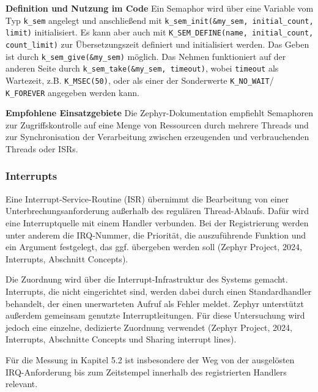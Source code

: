 \textbf{Definition und Nutzung im Code }Ein Semaphor wird {\"u}ber eine Variable vom Typ \lstinline[style=fileinline]|k_sem| angelegt und anschlie{\ss}end mit \lstinline[style=fileinline]|k_sem_init(&my_sem, initial_count, limit)| initialisiert. Es kann aber auch mit \lstinline[style=fileinline]|K_SEM_DEFINE(name, initial_count, count_limit)| zur {\"U}bersetzungszeit definiert und initialisiert werden. Das Geben ist durch \lstinline[style=fileinline]|k_sem_give(&my_sem)| m{\"o}glich. Das Nehmen funktioniert auf der anderen Seite durch \lstinline[style=fileinline]|k_sem_take(&my_sem, timeout)|, wobei \lstinline[style=fileinline]|timeout| als Wartezeit, z.B. \lstinline[style=fileinline]|K_MSEC(50)|, oder als einer der Sonderwerte \lstinline[style=fileinline]|K_NO_WAIT|/ \lstinline[style=fileinline]|K_FOREVER| angegeben werden kann.

\textbf{Empfohlene Einsatzgebiete }Die Zephyr-Dokumentation empfiehlt Semaphoren zur Zugriffskontrolle auf eine Menge von Ressourcen durch mehrere Threads und zur Synchronisation der Verarbeitung zwischen erzeugenden und verbrauchenden Threads oder ISRs.

\subsubsection{Interrupts}
Eine Interrupt-Service-Routine (ISR) {\"u}bernimmt die Bearbeitung von einer Unterbrechungsanforderung au{\ss}erhalb des regul{\"a}ren Thread-Ablaufs. Daf{\"u}r wird eine Interruptquelle mit einem Handler verbunden. Bei der Registrierung werden unter anderem die IRQ-Nummer, die Priorit{\"a}t, die auszuf{\"u}hrende Funktion und ein Argument festgelegt, das ggf. {\"u}bergeben werden soll (Zephyr Project, 2024, \glqq{}Interrupts\grqq{}, Abschnitt \glqq{}Concepts\grqq{}).

Die Zuordnung wird {\"u}ber die Interrupt-Infrastruktur des Systems gemacht. Interrupts, die nicht eingerichtet sind, werden dabei durch einen Standardhandler behandelt, der einen unerwarteten Aufruf als Fehler meldet. Zephyr unterst{\"u}tzt au{\ss}erdem gemeinsam genutzte Interruptleitungen. F{\"u}r diese Untersuchung wird jedoch eine einzelne, dedizierte Zuordnung verwendet (Zephyr Project, 2024, \glqq{}Interrupts\grqq{}, Abschnitte \glqq{}Concepts\grqq{} und \glqq{}Sharing interrupt lines\grqq{}).

F{\"u}r die Messung in Kapitel 5.2 ist insbesondere der Weg von der ausgel{\"o}sten IRQ-Anforderung bis zum Zeitstempel innerhalb des registrierten Handlers relevant.

